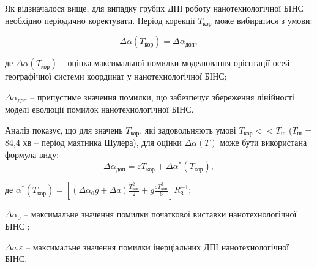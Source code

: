 Як відзначалося вище, для випадку грубих ДПІ роботу нанотехнологічної БІНС 
необхідно періодично коректувати. Період корекції ${T}_{\text{кор}} $ може вибиратися 
з умови:

\[\Delta \alpha ({T}_{\text{кор}})=\Delta \alpha_{\text{доп}} ,\] 
\begin{ESKDexplanation}
\item де $\Delta \alpha ({T}_{\text{кор}})$ -- оцінка максимальної помилки моделювання 
орієнтації осей географічної системи координат у нанотехнологічної БІНС;
\item $\Delta \alpha_{\text{доп}} $ -- припустиме значення помилки, що забезпечує збереження 
лінійності моделі еволюції помилок нанотехнологічної БІНС.
\end{ESKDexplanation}
Аналіз показує, що для значень ${T}_{\text{кор}}$, які задовольняють умові ${T}_{\text{кор}} <<T_{\text{ш}} $
($T_{\text{ш}} $ = 84,4 хв -- період маятника Шулера), для оцінки  $\Delta \alpha(T)$ може бути використана формула виду:
\[\Delta \alpha_{\text{доп}}=\varepsilon {T}_{\text{кор}} +\Delta \alpha ^{*} ({T}_{\text{кор}}),\] 
\begin{ESKDexplanation}
\item де $\alpha ^{*} ({T}_{\text{кор}})=\left[\left(\Delta \alpha_{0} g+\Delta a\right)\frac{{T}_{\text{кор}}^{2} }{2} 
+g\frac{\varepsilon {T}_{\text{кор}}^{3} }{6} \right]R_{\text{З}}^{-1} $;     
\item $\Delta \alpha_{0} $ -- максимальне значення помилки початкової виставки нанотехнологічної БІНС ;
\item $\Delta a$,$\varepsilon $ -- максимальне значення помилки інерціальних ДПІ нанотехнологічної БІНС.
\end{ESKDexplanation}

